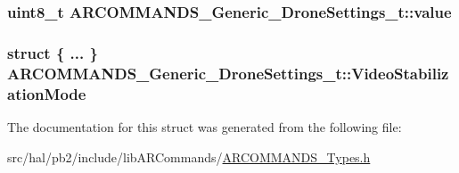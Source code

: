 \subsubsection[{\texorpdfstring{value}{value}}]{\setlength{\rightskip}{0pt plus 5cm}uint8\+\_\+t A\+R\+C\+O\+M\+M\+A\+N\+D\+S\+\_\+\+Generic\+\_\+\+Drone\+Settings\+\_\+t\+::value}\hypertarget{struct_a_r_c_o_m_m_a_n_d_s___generic___drone_settings__t_a0a9323ff5ffcd916428bc1b1dc93b2e7}{}\label{struct_a_r_c_o_m_m_a_n_d_s___generic___drone_settings__t_a0a9323ff5ffcd916428bc1b1dc93b2e7}
\subsubsection[{\texorpdfstring{Video\+Stabilization\+Mode}{VideoStabilizationMode}}]{\setlength{\rightskip}{0pt plus 5cm}struct \{ ... \}   A\+R\+C\+O\+M\+M\+A\+N\+D\+S\+\_\+\+Generic\+\_\+\+Drone\+Settings\+\_\+t\+::\+Video\+Stabilization\+Mode}\hypertarget{struct_a_r_c_o_m_m_a_n_d_s___generic___drone_settings__t_aef0afc8ce1214955ba8b7f589b3d21cf}{}\label{struct_a_r_c_o_m_m_a_n_d_s___generic___drone_settings__t_aef0afc8ce1214955ba8b7f589b3d21cf}


The documentation for this struct was generated from the following file\+:\begin{DoxyCompactItemize}
\item 
src/hal/pb2/include/lib\+A\+R\+Commands/\hyperlink{_a_r_c_o_m_m_a_n_d_s___types_8h}{A\+R\+C\+O\+M\+M\+A\+N\+D\+S\+\_\+\+Types.\+h}\end{DoxyCompactItemize}
